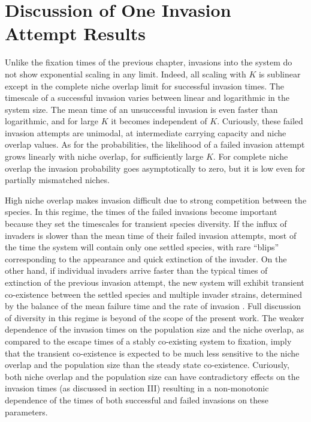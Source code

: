 \section{Discussion of One Invasion Attempt Results}
Unlike the fixation times of the previous chapter, invasions into the system do not show exponential scaling in any limit. 
Indeed, all scaling with $K$ is sublinear except in the complete niche overlap limit for successful invasion times. 
The timescale of a successful invasion varies between linear and logarithmic in the system size. 
The mean time of an unsuccessful invasion is even faster than logarithmic, and for large $K$ it becomes independent of $K$. 
Curiously, these failed invasion attempts are unimodal, at intermediate carrying capacity and niche overlap values. %
As for the probabilities, the likelihood of a failed invasion attempt grows linearly with niche overlap, for sufficiently large $K$. 
For complete niche overlap the invasion probability goes asymptotically to zero, but it is low even for partially mismatched niches. 

High niche overlap makes invasion difficult due to strong competition between the species. 
In this regime, the times of the failed invasions become important because they set the timescales for transient species diversity. 
If the influx of invaders is slower than the mean time of their failed invasion attempts, most of the time the system will contain only one settled species, with rare ``blips'' corresponding to the appearance and quick extinction of the invader. 
On the other hand, if individual invaders arrive faster than the typical times of extinction of the previous invasion attempt, the new system will exhibit transient co-existence between the settled species and multiple invader strains, determined by the balance of the mean failure time and the rate of invasion \cite{Dias1996,Hubbell2001,Chesson2000}. 
Full discussion of diversity in this regime is beyond of the scope of the present work. %
The weaker dependence of the invasion times on the population size and the niche overlap, as compared to the escape times of a stably co-existing system to fixation, imply that the transient co-existence is expected to be much less sensitive to the niche overlap and the population size than the steady state co-existence. 
Curiously, both niche overlap and the population size can have contradictory effects on the invasion times (as discussed in section III) resulting in a non-monotonic dependence of the times of both successful and failed invasions on these parameters.

